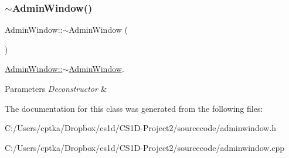 \subsubsection{\texorpdfstring{$\sim$\+Admin\+Window()}{~AdminWindow()}}
{\footnotesize\ttfamily Admin\+Window\+::$\sim$\+Admin\+Window (\begin{DoxyParamCaption}{ }\end{DoxyParamCaption})}



\mbox{\hyperlink{class_admin_window_ad31a734a759bfb65008b03e6bb9014d0}{Admin\+Window\+::$\sim$\+Admin\+Window}}. 


\begin{DoxyParams}{Parameters}
{\em Deconstructor} & \\
\hline
\end{DoxyParams}


The documentation for this class was generated from the following files\+:\begin{DoxyCompactItemize}
\item 
C\+:/\+Users/cptka/\+Dropbox/cs1d/\+C\+S1\+D-\/\+Project2/sourcecode/adminwindow.\+h\item 
C\+:/\+Users/cptka/\+Dropbox/cs1d/\+C\+S1\+D-\/\+Project2/sourcecode/adminwindow.\+cpp\end{DoxyCompactItemize}
